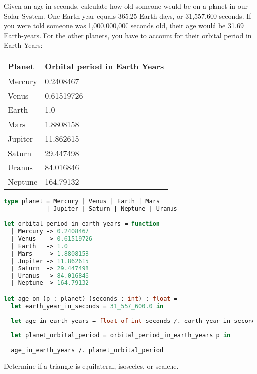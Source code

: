 Given an age in seconds, calculate how old someone would be on a planet in our Solar System.
One Earth year equals 365.25 Earth days, or 31,557,600 seconds.
If you were told someone was 1,000,000,000 seconds old, their age would be 31.69 Earth-years.
For the other planets, you have to account for their orbital period in Earth Years:

\begin{center}
  \begin{tabular}{l|l}
    Planet  & Orbital period in Earth Years \\
    \hline
    Mercury & 0.2408467                     \\
    Venus   & 0.61519726                    \\
    Earth   & 1.0                           \\
    Mars    & 1.8808158                     \\
    Jupiter & 11.862615                     \\
    Saturn  & 29.447498                     \\
    Uranus  & 84.016846                     \\
    Neptune & 164.79132                     \\
  \end{tabular}
\end{center}

\begin{lstlisting}[language=OCaml]
type planet = Mercury | Venus | Earth | Mars
            | Jupiter | Saturn | Neptune | Uranus

let orbital_period_in_earth_years = function
  | Mercury -> 0.2408467
  | Venus   -> 0.61519726
  | Earth   -> 1.0
  | Mars    -> 1.8808158
  | Jupiter -> 11.862615
  | Saturn  -> 29.447498
  | Uranus  -> 84.016846
  | Neptune -> 164.79132

let age_on (p : planet) (seconds : int) : float =
  let earth_year_in_seconds = 31_557_600.0 in
  
  let age_in_earth_years = float_of_int seconds /. earth_year_in_seconds in
  
  let planet_orbital_period = orbital_period_in_earth_years p in
  
  age_in_earth_years /. planet_orbital_period

\end{lstlisting}

Determine if a triangle is equilateral, isosceles, or scalene.

